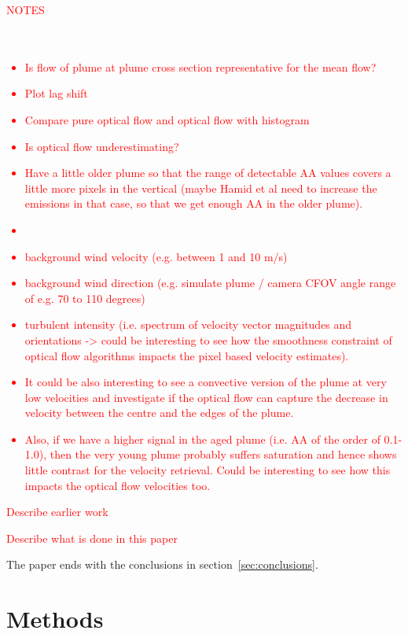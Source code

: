 \documentclass[amtd, manuscript]{copernicus}
\begin{document}
\textcolor{red}{
  NOTES\\
  \\
  \\
  \begin{itemize}
  \item
    Is flow of plume at plume cross section representative for the
    mean flow?
  \item
    Plot lag shift
  \item
    Compare pure optical flow and optical flow with histogram
  \item
    Is  optical flow underestimating?
\item Have a little older plume so that the
  range of detectable AA values covers a little more pixels in the
  vertical (maybe Hamid et al need to increase the emissions in that
  case, so that we get enough AA in the older plume).
\item
\item background wind velocity (e.g. between 1 and 10 m/s)
\item background wind direction (e.g. simulate plume / camera CFOV
  angle range of e.g. 70 to 110 degrees)
\item turbulent intensity (i.e. spectrum of velocity vector
  magnitudes and orientations -> could be interesting to see how the
  smoothness constraint of optical flow algorithms impacts the pixel
  based velocity estimates).
\item It could be also interesting to see a convective version of
  the plume at very low velocities and investigate if the optical
  flow can capture the decrease in velocity between the centre and
  the edges of the plume.
\item Also, if we have a higher signal in the aged plume (i.e. AA of the
  order of 0.1-1.0), then the very young plume probably suffers
  saturation and hence shows little contrast for the velocity
  retrieval. Could be interesting to see how this impacts the optical
  flow velocities too.
\end{itemize}
}

\introduction
\textcolor{red}{Describe earlier work}


\textcolor{red}{Describe what is done in this paper}


The paper ends with the conclusions in section~\ref{sec:conclusions}.


\section{Methods}
\label{sec:Methods}
\end{document}
